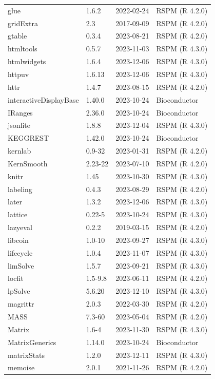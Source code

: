 \begin{longtable}[t]{llll}
glue & 1.6.2 & 2022-02-24 & RSPM (R 4.2.0)\\
gridExtra & 2.3 & 2017-09-09 & RSPM (R 4.2.0)\\
gtable & 0.3.4 & 2023-08-21 & RSPM (R 4.2.0)\\
htmltools & 0.5.7 & 2023-11-03 & RSPM (R 4.3.0)\\
\addlinespace
htmlwidgets & 1.6.4 & 2023-12-06 & RSPM (R 4.3.0)\\
httpuv & 1.6.13 & 2023-12-06 & RSPM (R 4.3.0)\\
httr & 1.4.7 & 2023-08-15 & RSPM (R 4.2.0)\\
interactiveDisplayBase & 1.40.0 & 2023-10-24 & Bioconductor\\
IRanges & 2.36.0 & 2023-10-24 & Bioconductor\\
\addlinespace
jsonlite & 1.8.8 & 2023-12-04 & RSPM (R 4.3.0)\\
KEGGREST & 1.42.0 & 2023-10-24 & Bioconductor\\
kernlab & 0.9-32 & 2023-01-31 & RSPM (R 4.2.0)\\
KernSmooth & 2.23-22 & 2023-07-10 & RSPM (R 4.2.0)\\
knitr & 1.45 & 2023-10-30 & RSPM (R 4.3.0)\\
\addlinespace
labeling & 0.4.3 & 2023-08-29 & RSPM (R 4.2.0)\\
later & 1.3.2 & 2023-12-06 & RSPM (R 4.3.0)\\
lattice & 0.22-5 & 2023-10-24 & RSPM (R 4.3.0)\\
lazyeval & 0.2.2 & 2019-03-15 & RSPM (R 4.2.0)\\
libcoin & 1.0-10 & 2023-09-27 & RSPM (R 4.3.0)\\
\addlinespace
lifecycle & 1.0.4 & 2023-11-07 & RSPM (R 4.3.0)\\
limSolve & 1.5.7 & 2023-09-21 & RSPM (R 4.3.0)\\
locfit & 1.5-9.8 & 2023-06-11 & RSPM (R 4.2.0)\\
lpSolve & 5.6.20 & 2023-12-10 & RSPM (R 4.3.0)\\
magrittr & 2.0.3 & 2022-03-30 & RSPM (R 4.2.0)\\
\addlinespace
MASS & 7.3-60 & 2023-05-04 & RSPM (R 4.2.0)\\
Matrix & 1.6-4 & 2023-11-30 & RSPM (R 4.3.0)\\
MatrixGenerics & 1.14.0 & 2023-10-24 & Bioconductor\\
matrixStats & 1.2.0 & 2023-12-11 & RSPM (R 4.3.0)\\
memoise & 2.0.1 & 2021-11-26 & RSPM (R 4.2.0)\\

\end{longtable}
